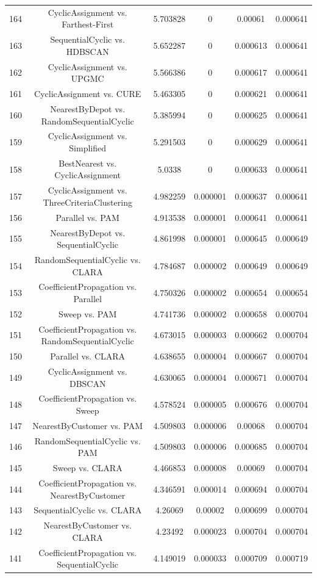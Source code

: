 \documentclass[a4paper,10pt]{article}
\begin{document}
\begin{landscape}
\begin{table}[!htp]
\begin{tabular}{cccccc}
164&CyclicAssignment vs. Farthest-First&5.703828&0&0.00061&0.000641\\
163&SequentialCyclic vs. HDBSCAN&5.652287&0&0.000613&0.000641\\
162&CyclicAssignment vs. UPGMC&5.566386&0&0.000617&0.000641\\
161&CyclicAssignment vs. CURE&5.463305&0&0.000621&0.000641\\
160&NearestByDepot vs. RandomSequentialCyclic&5.385994&0&0.000625&0.000641\\
159&CyclicAssignment vs. Simplified&5.291503&0&0.000629&0.000641\\
158&BestNearest vs. CyclicAssignment&5.0338&0&0.000633&0.000641\\
157&CyclicAssignment vs. ThreeCriteriaClustering&4.982259&0.000001&0.000637&0.000641\\
156&Parallel vs. PAM&4.913538&0.000001&0.000641&0.000641\\
155&NearestByDepot vs. SequentialCyclic&4.861998&0.000001&0.000645&0.000649\\
154&RandomSequentialCyclic vs. CLARA&4.784687&0.000002&0.000649&0.000649\\
153&CoefficientPropagation vs. Parallel&4.750326&0.000002&0.000654&0.000654\\
152&Sweep vs. PAM&4.741736&0.000002&0.000658&0.000704\\
151&CoefficientPropagation vs. RandomSequentialCyclic&4.673015&0.000003&0.000662&0.000704\\
150&Parallel vs. CLARA&4.638655&0.000004&0.000667&0.000704\\
149&CyclicAssignment vs. DBSCAN&4.630065&0.000004&0.000671&0.000704\\
148&CoefficientPropagation vs. Sweep&4.578524&0.000005&0.000676&0.000704\\
147&NearestByCustomer vs. PAM&4.509803&0.000006&0.00068&0.000704\\
146&RandomSequentialCyclic vs. PAM&4.509803&0.000006&0.000685&0.000704\\
145&Sweep vs. CLARA&4.466853&0.000008&0.00069&0.000704\\
144&CoefficientPropagation vs. NearestByCustomer&4.346591&0.000014&0.000694&0.000704\\
143&SequentialCyclic vs. CLARA&4.26069&0.00002&0.000699&0.000704\\
142&NearestByCustomer vs. CLARA&4.23492&0.000023&0.000704&0.000704\\
141&CoefficientPropagation vs. SequentialCyclic&4.149019&0.000033&0.000709&0.000719\\

\end{tabular}
\end{table}
\end{landscape}
\end{document}
